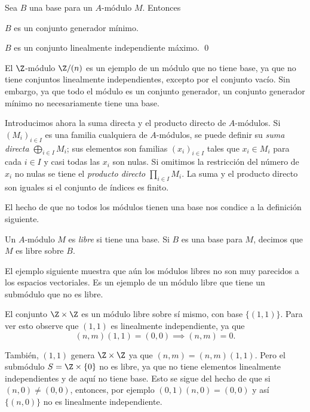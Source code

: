 \begin{theorem}\label{theo:1.7.5}%
  Sea $B$ una base para un $A$-módulo $M$. Entonces
  \begin{subtheorem}
    \item $B$ es un conjunto generador mínimo.
    \item $B$ es un conjunto linealmente independiente máximo. \qed
  \end{subtheorem}
\end{theorem}

El $\Z$-módulo $\Z/(n)$ es un ejemplo de un módulo que no tiene base, ya que no tiene conjuntos linealmente independientes, excepto por el conjunto vacío. Sin embargo, ya que todo el módulo es un conjunto generador, un conjunto generador mínimo no necesariamente tiene una base.

Introducimos ahora la suma directa y el producto directo de $A$-módulos. Si $(M_i)_{i \in I}$ es una familia cualquiera de $A$-módulos, se puede definir su \emph{suma directa} $\bigoplus_{i \in I} M_i$; sus elementos son familias $(x_i)_{i \in I}$ tales que $x_i \in M_i$ para cada $i \in I$ y casi todas las $x_i$ son nulas. Si omitimos la restricción del número de $x_i$ no nulas se tiene el \emph{producto directo} $\prod_{i \in I} M_i$. La suma y el producto directo son iguales si el conjunto de índices es finito.

El hecho de que no todos los módulos tienen una base nos condice a la definición siguiente.

\begin{definition}
  Un $A$-módulo $M$ es \emph{libre} si tiene una base. Si $B$ es una base para $M$, decimos que $M$ es libre sobre $B$.
\end{definition}

El ejemplo siguiente muestra que aún los módulos libres no son muy parecidos a los espacios vectoriales. Es un ejemplo de un módulo libre que tiene un submódulo que no es libre.

\begin{example}
  El conjunto $\Z \times \Z$ es un módulo libre sobre sí mismo, con base $\{(1,1)\}$. Para ver esto observe que $(1,1)$ es linealmente independiente, ya que
  \[
    (n,m)(1,1) = (0,0) \implies (n,m) = 0.
  \]

  También, $(1,1)$ genera $\Z \times \Z$ ya que $(n,m) = (n,m)(1,1)$. Pero el submódulo $S = \Z \times \{0\}$ no es libre, ya que no tiene elementos linealmente independientes y de aquí no tiene base. Esto se sigue del hecho de que si $(n,0) \neq (0,0)$, entonces, por ejemplo $(0,1)(n,0) = (0,0)$ y así $\{(n,0)\}$ no es linealmente independiente.
\end{example}

